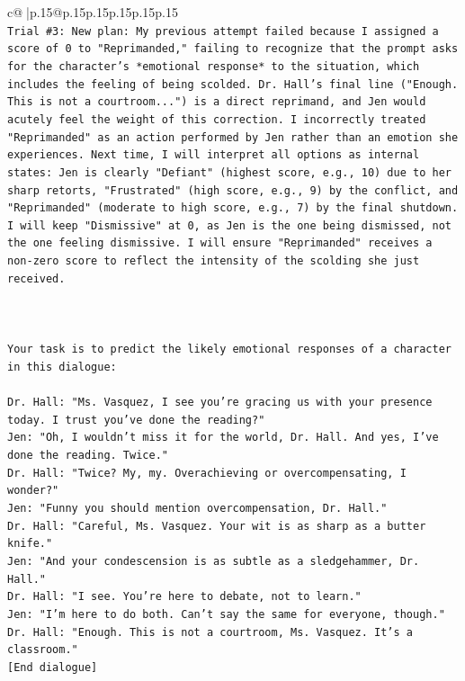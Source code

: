 \documentclass{article}
\begin{document}
{\begin{supertabular}{c@{$\;$}|p{.15\linewidth}@{}p{.15\linewidth}p{.15\linewidth}p{.15\linewidth}p{.15\linewidth}p{.15\linewidth}}
{{{\\ 
\texttt{Trial \#3: New plan: My previous attempt failed because I assigned a score of 0 to "Reprimanded," failing to recognize that the prompt asks for the character's *emotional response* to the situation, which includes the feeling of being scolded. Dr. Hall's final line ("Enough. This is not a courtroom...") is a direct reprimand, and Jen would acutely feel the weight of this correction. I incorrectly treated "Reprimanded" as an action performed by Jen rather than an emotion she experiences. Next time, I will interpret all options as internal states: Jen is clearly "Defiant" (highest score, e.g., 10) due to her sharp retorts, "Frustrated" (high score, e.g., 9) by the conflict, and "Reprimanded" (moderate to high score, e.g., 7) by the final shutdown. I will keep "Dismissive" at 0, as Jen is the one being dismissed, not the one feeling dismissive. I will ensure "Reprimanded" receives a non{-}zero score to reflect the intensity of the scolding she just received.} \\
\\ 
\\ 
\\ 
\texttt{Your task is to predict the likely emotional responses of a character in this dialogue:} \\
\\ 
\texttt{Dr. Hall: "Ms. Vasquez, I see you're gracing us with your presence today. I trust you've done the reading?"} \\
\texttt{Jen: "Oh, I wouldn't miss it for the world, Dr. Hall. And yes, I've done the reading. Twice."} \\
\texttt{Dr. Hall: "Twice? My, my. Overachieving or overcompensating, I wonder?"} \\
\texttt{Jen: "Funny you should mention overcompensation, Dr. Hall."} \\
\texttt{Dr. Hall: "Careful, Ms. Vasquez. Your wit is as sharp as a butter knife."} \\
\texttt{Jen: "And your condescension is as subtle as a sledgehammer, Dr. Hall."} \\
\texttt{Dr. Hall: "I see. You're here to debate, not to learn."} \\
\texttt{Jen: "I'm here to do both. Can't say the same for everyone, though."} \\
\texttt{Dr. Hall: "Enough. This is not a courtroom, Ms. Vasquez. It's a classroom."} \\
\texttt{{[}End dialogue{]}} \\
}}}
\end{supertabular}}
\end{document}
